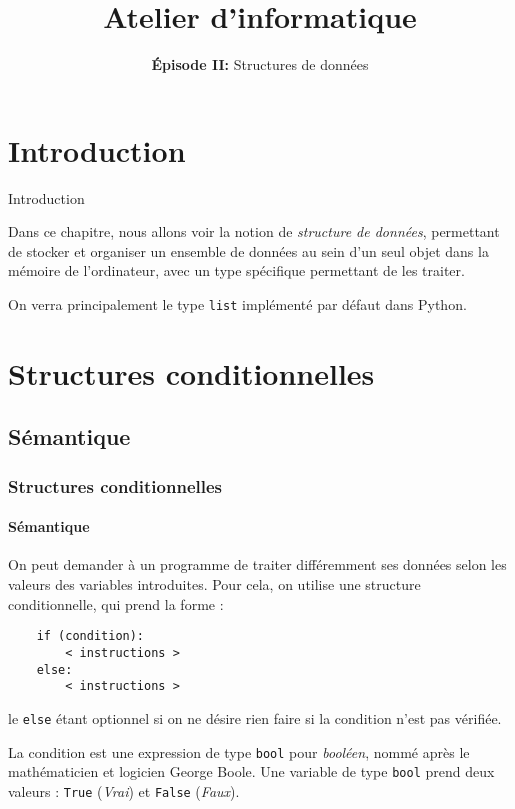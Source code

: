 
\title{Atelier d'informatique}
\subtitle{\textbf{Épisode II:} Structures de données}



\begin{frame}[fragile]
	\titlepage
\end{frame}

\section{Introduction}

\begin{frame}[fragile]{Introduction}
	
	Dans ce chapitre, nous allons voir la notion de \textit{structure de données}, permettant de stocker et organiser un ensemble de données au sein d'un seul objet dans la mémoire de l'ordinateur, avec un type spécifique permettant de les traiter.
	\pause
	
	On verra principalement le type \lstinline|list| implémenté par défaut dans Python.
\end{frame}

\frame{\tableofcontents}

\section{Structures conditionnelles}

\subsection{Sémantique}

\begin{frame}[fragile]
	\frametitle{Structures conditionnelles}
	\framesubtitle{Sémantique}
	On peut demander à un programme de traiter différemment ses données selon les valeurs des variables introduites. Pour cela, on utilise une structure conditionnelle, qui prend la forme :
	\begin{lstlisting}
	if (condition):
		< instructions >
	else:
		< instructions >
	\end{lstlisting}
	le \lstinline|else| étant optionnel si on ne désire rien faire si la condition n'est pas vérifiée.
	\pause
	
	La condition est une expression de type \lstinline|bool| pour \textit{booléen}, nommé après le mathématicien et logicien George Boole. Une variable de type \lstinline|bool| prend deux valeurs : \lstinline|True| (\textit{Vrai}) et \lstinline|False| (\textit{Faux}).
\end{frame}


